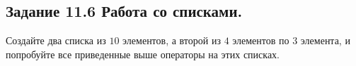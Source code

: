 \subsection*{\textbf{Задание 11.6} Работа со списками.}
Создайте два списка из $10$ элементов, а второй из $4$ элементов
по $3$ элемента, и попробуйте все приведенные выше операторы на этих списках.

\begin{figure}[H]
    \renewcommand{\figurename}{Рисунок}
    \label{fig:image_6_1}
\end{figure}

